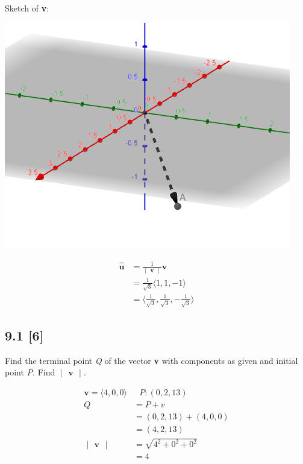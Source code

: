 \documentclass{article}
\begin{document}
Sketch of \textbf{v}:

\includegraphics{9.1.2.png}

\begin{align}
    \hat{\textbf{u}} &= \frac{1}{\begin{vmatrix}
    \textbf{v}
    \end{vmatrix}} \textbf{v}
    \\
    &= \frac{1}{\sqrt{3}}\langle1, 1, -1\rangle
    \\
    &= \langle\frac{1}{\sqrt{3}}, \frac{1}{\sqrt{3}}, -\frac{1}{\sqrt{3}}\rangle
\end{align}

\subsection*{9.1 [6]}
\setcounter{equation}{0}

Find the terminal point \textit{Q} of the vector \textbf{v} with components as given and initial point \textit{P}.  Find $\begin{vmatrix}
\textbf{v}
\end{vmatrix}$.

\begin{align}
    \textbf{v} = \langle4, 0, 0\rangle &\text{    } P: (0, 2, 13)
    \\
    Q &= P + v
    \\
    &= (0, 2, 13) + (4, 0, 0)
    \\
    &= (4, 2, 13)
    \\
    \begin{vmatrix}
    \textbf{v}
    \end{vmatrix} &= \sqrt{4^2 + 0^2 + 0^2}
    \\
    &= 4
\end{align}
\end{document}

